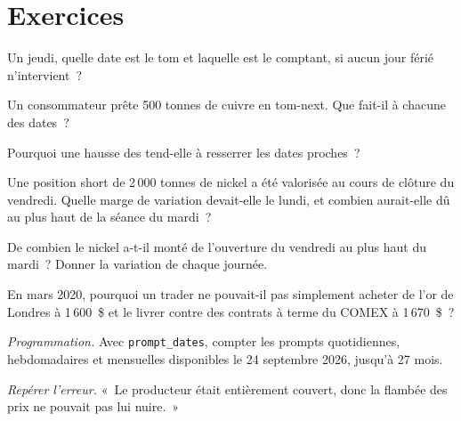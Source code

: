 \section{Exercices}

\begin{exercise}[$\star$]\label{exo:m3:metals:1}
Un jeudi, quelle date est le tom et laquelle est le comptant, si aucun jour férié n'intervient~?
\end{exercise}

\begin{exercise}[$\star$]\label{exo:m3:metals:2}
Un consommateur prête 500 tonnes de cuivre en tom-next. Que fait-il à chacune des dates~?
\end{exercise}

\begin{exercise}[$\star$]\label{exo:m3:metals:3}
Pourquoi une hausse des  tend-elle à resserrer les dates proches~?
\end{exercise}

\begin{exercise}[$\star\star$]\label{exo:m3:metals:4}
Une position short de 2\,000 tonnes de nickel a été valorisée au cours de clôture du vendredi. Quelle marge de variation devait-elle
le lundi, et combien aurait-elle dû au plus haut de la séance du mardi~?
\end{exercise}

\begin{exercise}[$\star\star$]\label{exo:m3:metals:5}
De combien le nickel a-t-il monté de l'ouverture du vendredi au plus haut du mardi~? Donner la variation de chaque journée.
\end{exercise}

\begin{exercise}[$\star\star$]\label{exo:m3:metals:6}
En mars 2020, pourquoi un trader ne pouvait-il pas simplement acheter de l'or de Londres à 1\,600~\$ et le livrer contre
des contrats à terme du COMEX à 1\,670~\$~?
\end{exercise}

\begin{exercise}[$\star\star\star$]\label{exo:m3:metals:7}
\emph{Programmation.} Avec \texttt{prompt\_dates}, compter les prompts quotidiennes, hebdomadaires et mensuelles disponibles le
24 septembre 2026, jusqu'à 27 mois.
\end{exercise}

\begin{exercise}[$\star\star\star$]\label{exo:m3:metals:8}
\emph{Repérer l'erreur.} «~Le producteur était entièrement couvert, donc la flambée des prix ne pouvait pas lui nuire.~»
\end{exercise}

